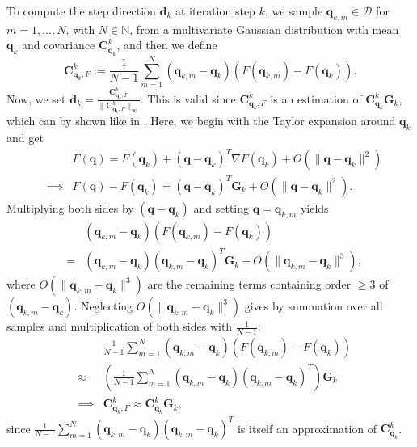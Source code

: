 To compute the step direction $\mathbf{d}_k$ at iteration step $k$, we sample $\mathbf{q}_{k,m}\in\mathcal{D}$ for $m=1,...,N$, with $N\in\mathbb{N}$, from a multivariate Gaussian distribution with mean $\mathbf{q}_k$ and covariance $\mathbf{C}_{\mathbf{q}_k}^k$, and then we define
\begin{equation}
\label{CqkF}
\mathbf{C}_{\mathbf{q}_k,F}^k:=\frac{1}{N-1}\sum_{m=1}^N(\mathbf{q}_{k,m}-\mathbf{q}_k)(F(\mathbf{q}_{k,m})-F(\mathbf{q}_k)).
\end{equation}
Now, we set $\mathbf{d}_k=\frac{\mathbf{C}_{\mathbf{q}_k,F}^k}{\|\mathbf{C}_{\mathbf{q}_k,F}^k\|_\infty}$. This is valid since $\mathbf{C}_{\mathbf{q}_k,F}^k$ is an estimation of $\mathbf{C}_{\mathbf{q}_k}^k\mathbf{G}_k$, which can by shown like in \cite{OGUNTOLA2021109165}. Here, we begin with the Taylor expansion around $\mathbf{q}_k$ and get
\begin{eqnarray*}
&&F(\mathbf{q})=F(\mathbf{q}_k)+(\mathbf{q}-\mathbf{q}_k)^T\nabla F(\mathbf{q}_k)+O(\|\mathbf{q}-\mathbf{q}_k\|^2)\\
&\implies&F(\mathbf{q})-F(\mathbf{q}_k)=(\mathbf{q}-\mathbf{q}_k)^T\mathbf{G}_k+O(\|\mathbf{q}-\mathbf{q}_k\|^2).
\end{eqnarray*}
Multiplying both sides by $(\mathbf{q}-\mathbf{q}_k)$ and setting $\mathbf{q}=\mathbf{q}_{k,m}$ yields
\begin{eqnarray*}
&&(\mathbf{q}_{k,m}-\mathbf{q}_k)(F(\mathbf{q}_{k,m})-F(\mathbf{q}_k))\\
&=&(\mathbf{q}_{k,m}-\mathbf{q}_k)(\mathbf{q}_{k,m}-\mathbf{q}_k)^T\mathbf{G}_k+O(\|\mathbf{q}_{k,m}-\mathbf{q}_k\|^3),
\end{eqnarray*}
where $O(\|\mathbf{q}_{k,m}-\mathbf{q}_k\|^3)$ are the remaining terms containing order $\geq3$ of $(\mathbf{q}_{k,m}-\mathbf{q}_k)$. Neglecting $O(\|\mathbf{q}_{k,m}-\mathbf{q}_k\|^3)$ gives by summation over all samples and multiplication of both sides with $\frac{1}{N-1}$:
\begin{eqnarray*}
&&\frac{1}{N-1}\sum_{m=1}^N(\mathbf{q}_{k,m}-\mathbf{q}_k)(F(\mathbf{q}_{k,m})-F(\mathbf{q}_k))\\
&\approx&\left(\frac{1}{N-1}\sum_{m=1}^N(\mathbf{q}_{k,m}-\mathbf{q}_k)(\mathbf{q}_{k,m}-\mathbf{q}_k)^T\right)\mathbf{G}_k\\
&\implies&\mathbf{C}_{\mathbf{q}_k,F}^k\approx\mathbf{C}_{\mathbf{q}_k}^k\mathbf{G}_k,
\end{eqnarray*}
since $\frac{1}{N-1}\sum_{m=1}^N(\mathbf{q}_{k,m}-\mathbf{q}_k)(\mathbf{q}_{k,m}-\mathbf{q}_k)^T$ is itself an approximation of $\mathbf{C}_{\mathbf{q}_k}^k$.\\

